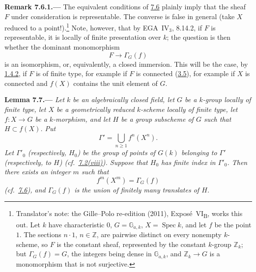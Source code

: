 
\medskip
{}\label{rem:sga3-VIB-7.6.1}%
\noindent\textbf{Remark 7.6.1.---}
The equivalent conditions of
\hyperref[prop:sga3-VIB-7.6]{7.6} plainly imply that the sheaf
\(F\) under consideration is representable. The converse is
false in general (take \(X\) reduced to a point!).\footnote{Translator's note: the Gille--Polo re-edition (2011),
Exposé~VI\textsubscript{B}, works this out. Let \(k\) have characteristic \(0\), \(G=\mathbb G_{a,k}\),
\(X=\operatorname{Spec}k\), and let \(f\) be the point \(1\). The sections \(n\cdot1\), \(n\in\mathbb Z\), are
pairwise distinct on every nonempty \(k\)-scheme, so \(F\) is the constant sheaf, represented by the constant
\(k\)-group \(\mathbb Z_k\); but \(\Gamma_G(f)=G\), the integers being dense in \(\mathbb G_{a,k}\), and
\(\mathbb Z_k\to G\) is a monomorphism that is not surjective.} Note,
however, that by EGA~IV\(_3\), 8.14.2, if \(F\) is
representable, it is locally of finite presentation over \(k\);
the question is then whether the dominant monomorphism
\[
  F\longrightarrow\Gamma_G(f)
\]
is an isomorphism, or, equivalently, a closed immersion. This
will be the case, by \hyperref[cor:sga3-VIB-1.4.2]{1.4.2}, if
\(F\) is of finite type, for example if \(F\) is connected
(\hyperref[prop:sga3-VIB-3.5]{3.5}), for example if \(X\) is
connected and \(f(X)\) contains the unit element of \(G\).

\medskip
{}\label{lem:sga3-VIB-7.7}%
\noindent\textbf{Lemma 7.7.---}
\emph{Let \(k\) be an algebraically closed field, let \(G\) be
a \(k\)-group locally of finite type, let \(X\) be a
geometrically reduced \(k\)-scheme locally of finite type, let
\(f:X\to G\) be a \(k\)-morphism, and let \(H\) be a group
subscheme of \(G\) such that \(H\subset f(X)\). Put}
\label{form:sga3-VIB-7.7-Gamma-prime}%
\[
  \Gamma'=\bigcup_{n\geq1}f^n(X^n).
\]
\emph{Let \(\Gamma'_0\) \textup{(}respectively, \(H_0\)\textup{)}
be the group of points of \(G(k)\) belonging to \(\Gamma'\)
\textup{(}respectively, to \(H\)\textup{)}
\textup{(cf.\ \hyperref[def:sga3-VIB-7.2-viii]{7.2\textup{(viii)}})}. Suppose
that \(H_0\) has finite index in \(\Gamma'_0\). Then there
exists an integer \(m\) such that}
\[
  f^m(X^m)=\Gamma_G(f)
\]
\emph{(cf.\ \hyperref[prop:sga3-VIB-7.6]{7.6}), and
\(\Gamma_G(f)\) is the union of finitely many translates of
\(H\).}

